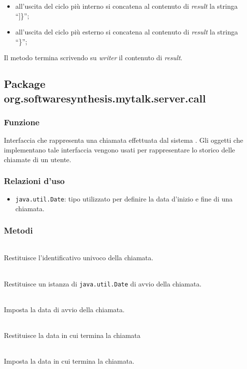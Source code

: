\begin{description}
\begin{itemize}
\begin{itemize}
\begin{itemize}
				\item all'uscita del ciclo  più interno si concatena al contenuto di \textit{result} la stringa ``]\}'';
				\item all'uscita del ciclo  più esterno si concatena al contenuto di \textit{result} la stringa ``\}'';
			\end{itemize}
		\end{itemize}
	\end{itemize}
	Il metodo termina scrivendo su \textit{writer} il contenuto di \textit{result}.	
	
\end{description}

\subsection{Package org.softwaresynthesis.mytalk.server.call}\label{sec:call}


\subsubsection*{Funzione}
Interfaccia che rappresenta una chiamata effettuata dal sistema \caName. Gli oggetti che implementano tale interfaccia vengono usati per rappresentare lo storico delle chiamate di un utente.

\subsubsection*{Relazioni d'uso}
\begin{itemize}
	\item \texttt{java.util.Date}: tipo utilizzato per definire la data d'inizio e fine di una chiamata.
\end{itemize}

\subsubsection*{Metodi}
\begin{description}
	\item{}\\
	Restituisce l'identificativo univoco della chiamata.
	\item{}\\
	Restituisce un istanza di \texttt{java.util.Date} di avvio della chiamata.
	\item{}\\
	Imposta la data di avvio della chiamata.
	\item{}\\
	Restituisce la data in cui termina la chiamata
	\item{}\\
	Imposta la data in cui termina la chiamata.
\end{description}

